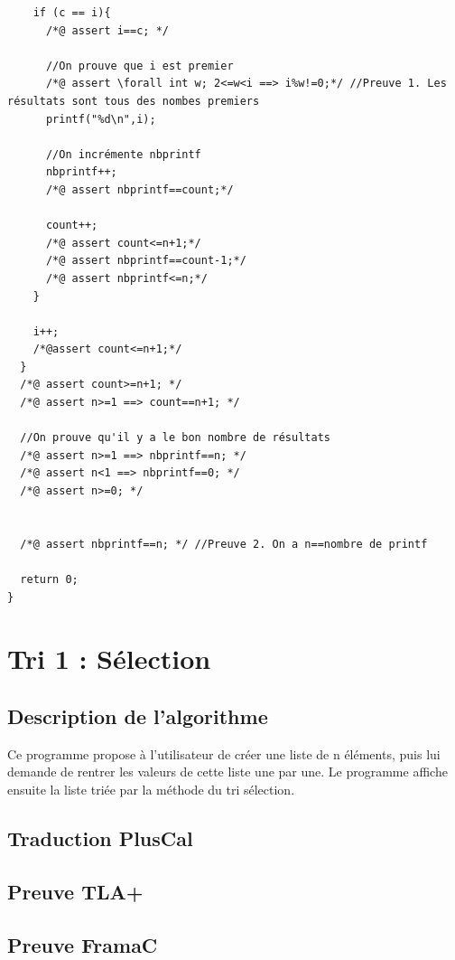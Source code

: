 \documentclass{scrreprt}
\begin{document}
\begin{lstlisting}
    if (c == i){
      /*@ assert i==c; */
      
      //On prouve que i est premier
      /*@ assert \forall int w; 2<=w<i ==> i%w!=0;*/ //Preuve 1. Les résultats sont tous des nombes premiers
      printf("%d\n",i);
      
	  //On incrémente nbprintf
	  nbprintf++;
      /*@ assert nbprintf==count;*/
      
      count++;
      /*@ assert count<=n+1;*/
      /*@ assert nbprintf==count-1;*/
      /*@ assert nbprintf<=n;*/
    }
    
    i++;
    /*@assert count<=n+1;*/
  }
  /*@ assert count>=n+1; */
  /*@ assert n>=1 ==> count==n+1; */

  //On prouve qu'il y a le bon nombre de résultats
  /*@ assert n>=1 ==> nbprintf==n; */
  /*@ assert n<1 ==> nbprintf==0; */
  /*@ assert n>=0; */

  
  /*@ assert nbprintf==n; */ //Preuve 2. On a n==nombre de printf
  
  return 0;
}
\end{lstlisting}


%
%
%

\chapter{Tri 1 : Sélection}

\section{Description de l'algorithme}
Ce programme propose à l'utilisateur de créer une liste de n éléments, puis lui demande de rentrer les valeurs de cette liste une par une. Le programme affiche ensuite la liste triée par la méthode du tri sélection.

\section{Traduction PlusCal}

\section{Preuve TLA+}

\section{Preuve FramaC}
\end{document}
